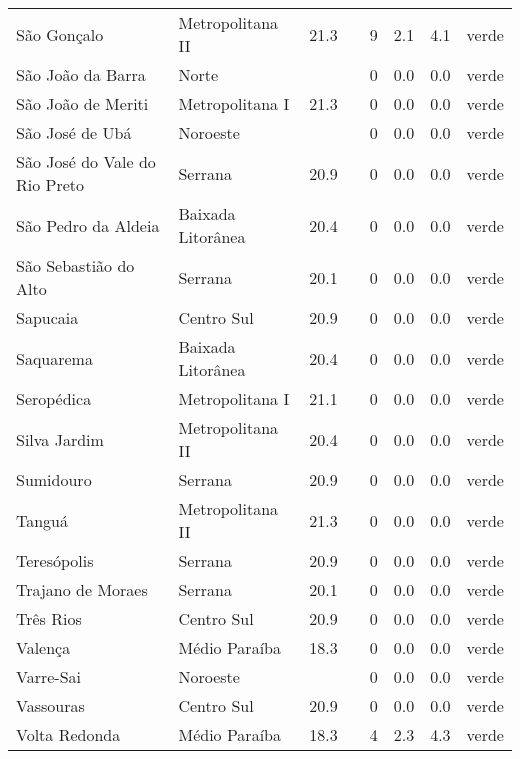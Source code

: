 \begin{longtable}{l|lllllll}
  São Gonçalo & Metropolitana II & 21.3 &  & 9 & 2.1 & 4.1 & verde \\ 
  São João da Barra & Norte &  &  & 0 & 0.0 & 0.0 & verde \\ 
  São João de Meriti & Metropolitana I & 21.3 &  & 0 & 0.0 & 0.0 & verde \\ 
  São José de Ubá & Noroeste &  &  & 0 & 0.0 & 0.0 & verde \\ 
  São José do Vale do Rio Preto & Serrana & 20.9 &  & 0 & 0.0 & 0.0 & verde \\ 
  São Pedro da Aldeia & Baixada Litorânea & 20.4 &  & 0 & 0.0 & 0.0 & verde \\ 
  São Sebastião do Alto & Serrana & 20.1 &  & 0 & 0.0 & 0.0 & verde \\ 
  Sapucaia & Centro Sul & 20.9 &  & 0 & 0.0 & 0.0 & verde \\ 
  Saquarema & Baixada Litorânea & 20.4 &  & 0 & 0.0 & 0.0 & verde \\ 
  Seropédica & Metropolitana I & 21.1 &  & 0 & 0.0 & 0.0 & verde \\ 
  Silva Jardim & Metropolitana II & 20.4 &  & 0 & 0.0 & 0.0 & verde \\ 
  Sumidouro & Serrana & 20.9 &  & 0 & 0.0 & 0.0 & verde \\ 
  Tanguá & Metropolitana II & 21.3 &  & 0 & 0.0 & 0.0 & verde \\ 
  Teresópolis & Serrana & 20.9 &  & 0 & 0.0 & 0.0 & verde \\ 
  Trajano de Moraes & Serrana & 20.1 &  & 0 & 0.0 & 0.0 & verde \\ 
  Três Rios & Centro Sul & 20.9 &  & 0 & 0.0 & 0.0 & verde \\ 
  Valença & Médio Paraíba & 18.3 &  & 0 & 0.0 & 0.0 & verde \\ 
  Varre-Sai & Noroeste &  &  & 0 & 0.0 & 0.0 & verde \\ 
  Vassouras & Centro Sul & 20.9 &  & 0 & 0.0 & 0.0 & verde \\ 
  Volta Redonda & Médio Paraíba & 18.3 &  & 4 & 2.3 & 4.3 & verde \\ 
  \hline
\end{longtable}
